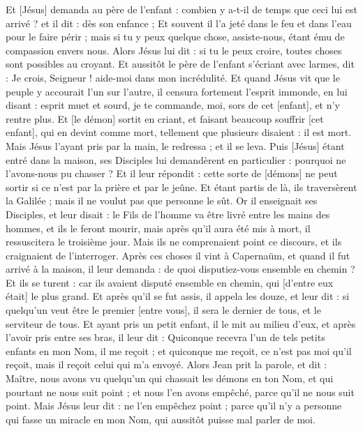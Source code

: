 \begin{multicols}{2}
Et [Jésus] demanda au père de l'enfant : combien y a-t-il de temps que ceci lui est arrivé ? et il dit : dès son enfance ;
Et souvent il l’a jeté dans le feu et dans l'eau pour le faire périr ; mais si tu y peux quelque chose, assiste-nous, étant ému de compassion envers nous.
Alors Jésus lui dit : si tu le peux croire, toutes choses sont possibles au croyant.
Et aussitôt le père de l'enfant s'écriant avec larmes, dit : Je crois, Seigneur ! aide-moi dans mon incrédulité.
Et quand Jésus vit que le peuple y accourait l'un sur l'autre, il censura fortement l'esprit immonde, en lui disant : esprit muet et sourd, je te commande, moi, sors de cet [enfant], et n'y rentre plus.
Et [le démon] sortit en criant, et faisant beaucoup souffrir [cet enfant], qui en devint comme mort, tellement que plusieurs disaient : il est mort.
Mais Jésus l'ayant pris par la main, le redressa ; et il se leva.
Puis [Jésus] étant entré dans la maison, ses Disciples lui demandèrent en particulier : pourquoi ne l'avons-nous pu chasser ?
Et il leur répondit : cette sorte de [démons] ne peut sortir si ce n'est par la prière et par le jeûne.
Et étant partis de là, ils traversèrent la Galilée ; mais il ne voulut pas que personne le sût.
Or il enseignait ses Disciples, et leur disait : le Fils de l'homme va être livré entre les mains des hommes, et ils le feront mourir, mais après qu'il aura été mis à mort, il ressuscitera le troisième jour.
Mais ils ne comprenaient point ce discours, et ils craignaient de l'interroger.
Après ces choses il vint à Capernaüm, et quand il fut arrivé à la maison, il leur demanda : de quoi disputiez-vous ensemble en chemin ?
Et ils se turent : car ils avaient disputé ensemble en chemin, qui [d'entre eux était] le plus grand.
Et après qu’il se fut assis, il appela les douze, et leur dit : si quelqu'un veut être le premier [entre vous], il sera le dernier de tous, et le serviteur de tous.
Et ayant pris un petit enfant, il le mit au milieu d'eux, et après l'avoir pris entre ses bras, il leur dit :
Quiconque recevra l'un de tels petits enfants en mon Nom, il me reçoit ; et quiconque me reçoit, ce n'est pas moi qu’il reçoit, mais il reçoit celui qui m'a envoyé.
Alors Jean prit la parole, et dit : Maître, nous avons vu quelqu'un qui chassait les démons en ton Nom, et qui pourtant ne nous suit point ; et nous l'en avons empêché, parce qu'il ne nous suit point.
Mais Jésus leur dit : ne l'en empêchez point ; parce qu'il n'y a personne qui fasse un miracle en mon Nom, qui aussitôt puisse mal parler de moi.

\end{multicols}
